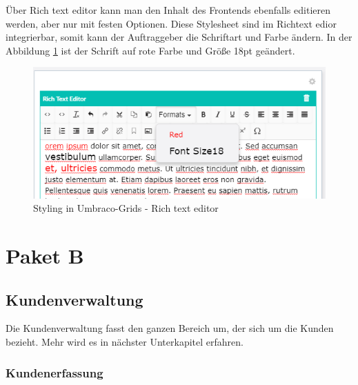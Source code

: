 Über Rich text editor kann man den Inhalt des Frontends ebenfalls editieren werden, aber nur mit festen Optionen. 
Diese Stylesheet sind im Richtext edior integrierbar, somit kann der Auftraggeber die Schriftart und Farbe ändern. In der Abbildung \ref{fig:schriftManip} ist der Schrift auf rote Farbe und Größe 18pt geändert.

 \begin{figure}[h]
	\centering
	\includegraphics[width=0.6\linewidth]{Graphics/schriftManip.png}
	\caption[StylingGrind]{Styling in Umbraco-Grids - Rich text editor}
	\label{fig:schriftManip}
\end{figure}

\section{Paket B}

\subsection{Kundenverwaltung}
Die Kundenverwaltung fasst den ganzen Bereich um, der sich um die Kunden bezieht. Mehr wird es in nächster Unterkapitel erfahren.

\subsubsection{Kundenerfassung}

